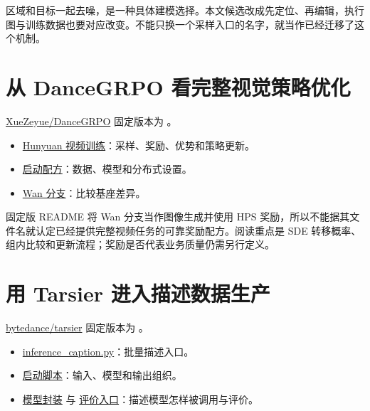 区域和目标一起去噪，是一种具体建模选择。本文候选改成先定位、再编辑，执行图与训练数据也要对应改变。不能只换一个采样入口的名字，就当作已经迁移了这个机制。

\section{从 DanceGRPO 看完整视觉策略优化}\label{seedance-m15-ux4ece-dancegrpo-ux770bux5b8cux6574ux89c6ux89c9ux7b56ux7565ux4f18ux5316}

\href{https://github.com/XueZeyue/DanceGRPO}{XueZeyue/DanceGRPO} 固定版本为 。

\begin{itemize}
\tightlist
\item
  \href{https://github.com/XueZeyue/DanceGRPO/blob/15cc71d53cc2e6e18a68ee607d5fb6ba9a99e344/fastvideo/train_grpo_hunyuan.py}{Hunyuan 视频训练}：采样、奖励、优势和策略更新。
\item
  \href{https://github.com/XueZeyue/DanceGRPO/blob/15cc71d53cc2e6e18a68ee607d5fb6ba9a99e344/scripts/finetune/finetune_hunyuan_grpo.sh}{启动配方}：数据、模型和分布式设置。
\item
  \href{https://github.com/XueZeyue/DanceGRPO/blob/15cc71d53cc2e6e18a68ee607d5fb6ba9a99e344/fastvideo/train_grpo_wan_2_1.py}{Wan 分支}：比较基座差异。
\end{itemize}

固定版 README 将 Wan 分支当作图像生成并使用 HPS 奖励，所以不能据其文件名就认定已经提供完整视频任务的可靠奖励配方。阅读重点是 SDE 转移概率、组内比较和更新流程；奖励是否代表业务质量仍需另行定义。

\section{用 Tarsier 进入描述数据生产}\label{seedance-m15-ux7528-tarsier-ux8fdbux5165ux63cfux8ff0ux6570ux636eux751fux4ea7}

\href{https://github.com/bytedance/tarsier}{bytedance/tarsier} 固定版本为 。

\begin{itemize}
\tightlist
\item
  \href{https://github.com/bytedance/tarsier/blob/63de87a760c2aec6b31470a08046969a13787126/tasks/inference_caption.py}{inference\_caption.py}：批量描述入口。
\item
  \href{https://github.com/bytedance/tarsier/blob/63de87a760c2aec6b31470a08046969a13787126/scripts/run_inference_caption.sh}{启动脚本}：输入、模型和输出组织。
\item
  \href{https://github.com/bytedance/tarsier/blob/63de87a760c2aec6b31470a08046969a13787126/models/modeling_tarsier.py}{模型封装} 与 \href{https://github.com/bytedance/tarsier/blob/63de87a760c2aec6b31470a08046969a13787126/evaluation/evaluate.py}{评价入口}：描述模型怎样被调用与评价。
\end{itemize}

